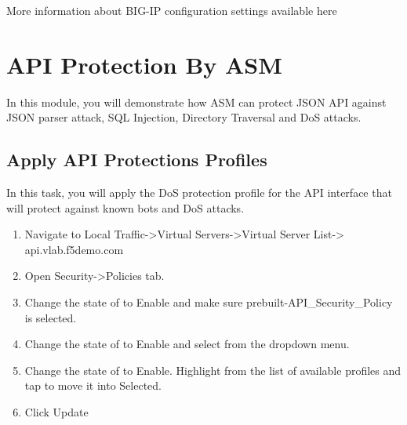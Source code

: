 \documentclass[letterpaper,10pt,english]{sphinxmanual}
\begin{document}
More information about BIG-IP configuration settings available here {\hyperref[\detokenize{class2/class2:f5-big-ip-configuration-deep-dive}]{}}


\section{API Protection By ASM}
\label{\detokenize{class1/module4/module4::doc}}\label{\detokenize{class1/module4/module4:api-protection-by-asm}}
In this module, you will demonstrate how ASM can protect JSON API
against JSON parser attack, SQL Injection, Directory Traversal and DoS
attacks.


\subsection{Apply API Protections Profiles}
\label{\detokenize{class1/module4/module4:apply-api-protections-profiles}}
In this task, you will apply the DoS protection profile for the API
interface that will protect against known bots and DoS attacks.
\begin{enumerate}
\item {} 
Navigate to Local Traffic-\textgreater{}Virtual Servers-\textgreater{}Virtual Server List-\textgreater{}
api.vlab.f5demo.com

\item {} 
Open Security-\textgreater{}Policies tab.

\item {} 
Change the state of  to Enable and make sure prebuilt-API\_Security\_Policy is selected.

\item {} 
Change the state of  to Enable and select  from the dropdown menu.

\item {} 
Change the state of  to Enable. Highlight  from the list of available profiles and tap \sphinxstylestrong{\textless{}\textless{}} to move it into Selected.

\end{enumerate}
\begin{quote}

\noindent{}
\end{quote}
\begin{enumerate}
\setcounter{enumi}{5}
\item {} 
Click Update

\end{enumerate}
\end{document}
